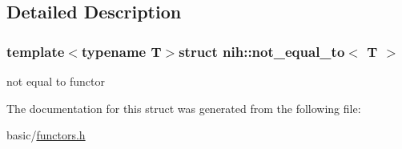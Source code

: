 \subsection{\-Detailed \-Description}
\subsubsection*{template$<$typename T$>$struct nih\-::not\-\_\-equal\-\_\-to$<$ T $>$}

not equal to functor 

\-The documentation for this struct was generated from the following file\-:\begin{DoxyCompactItemize}
\item 
basic/\hyperlink{functors_8h}{functors.\-h}\end{DoxyCompactItemize}

